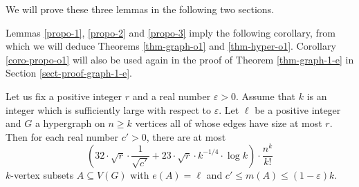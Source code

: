 We will prove these three lemmas in the following two sections.

Lemmas \ref{propo-1}, \ref{propo-2} and \ref{propo-3} imply the following corollary, from which we will deduce Theorems \ref{thm-graph-o1} and \ref{thm-hyper-o1}. Corollary \ref{coro-propo-o1} will also be used again in the proof of Theorem \ref{thm-graph-1-e} in Section \ref{sect-proof-graph-1-e}.

\begin{corollary}\label{coro-propo-o1}Let us fix a positive integer $r$ and a real number $\varepsilon>0$. Assume that $k$ is an integer which is sufficiently large with respect to $\varepsilon$. Let $\ell$ be a positive integer and $G$ a hypergraph on $n \geq k$ vertices all of whose edges have size at most $r$. Then for each real number $c'>0$, there are at most
\[\left(32\cdot \sqrt{r}\cdot \frac{1}{\sqrt{c'}}+23 \cdot \sqrt{r}\cdot k^{-1/4}\cdot \log k\right)\cdot \frac{n^k}{k!} \]
$k$-vertex subsets $A\subseteq V(G)$ with $e(A)=\ell$ and $c' \leq m(A)\leq (1-\varepsilon) k$.
\end{corollary}
